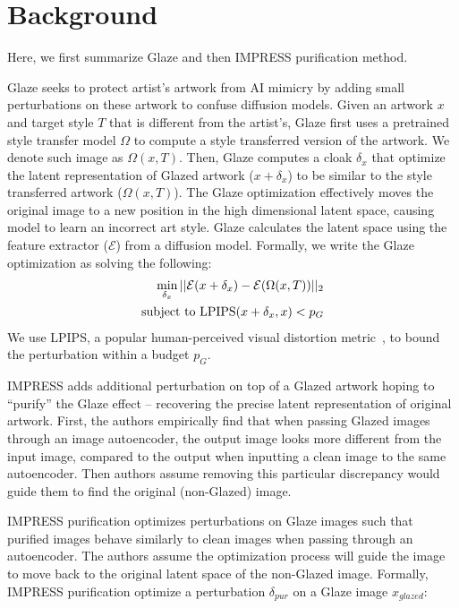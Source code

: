 \secspace
\section{Background}
\label{sec:back}

Here, we first summarize Glaze and then IMPRESS purification method. 

 Glaze seeks to protect artist's 
artwork from AI mimicry by adding small 
perturbations on these artwork to confuse diffusion models. 
Given an artwork $x$ and target style $T$ that is different from the artist's, 
Glaze first uses a pretrained style transfer model $\Omega$ to compute a style 
transferred version of the artwork. We denote such image as $\Omega(x, T)$. Then, Glaze 
computes a cloak $\delta_x$ that optimize the latent representation of Glazed artwork
($x + \delta_x$) to be similar to the style transferred artwork ($\Omega(x, T)$). 
The Glaze optimization effectively moves the original image to a new position in 
the high dimensional latent space, causing model to learn an incorrect art style. 
Glaze calculates the latent space using the 
feature extractor ($\mathcal{E}$) from a diffusion model.
Formally, we write the Glaze 
optimization as solving the following:
\begin{align}
    \min_{\delta_x} ||\mathcal{E}(x + \delta_x) - \mathcal{E}(\Omega(x, T))||_2 \\
    \text{subject to } \text{LPIPS}(x + \delta_x, x) < p_{G} \notag
\end{align}
\noindent We use LPIPS, a popular human-perceived visual distortion metric~\cite{zhang2018unreasonable}, to bound the perturbation 
within a budget $p_{G}$. 

 IMPRESS adds additional perturbation on top of a Glazed artwork 
hoping to ``purify'' the Glaze
effect -- recovering the precise latent representation of original artwork. 
First, the authors empirically find that when passing Glazed images through an image autoencoder, 
the output image looks more different from the input image, compared to the output 
when inputting a clean image to the same autoencoder. Then authors assume removing this particular 
discrepancy would guide them to find the original (non-Glazed) image. 

IMPRESS purification  
optimizes perturbations on Glaze images such that purified images
behave similarly to clean images
when passing through an autoencoder. The authors assume the optimization process will guide 
the image to move back to the original latent space of the non-Glazed image. 
Formally, IMPRESS purification optimize a perturbation $\delta_{pur}$ on 
a Glaze image $x_{glazed}$:

